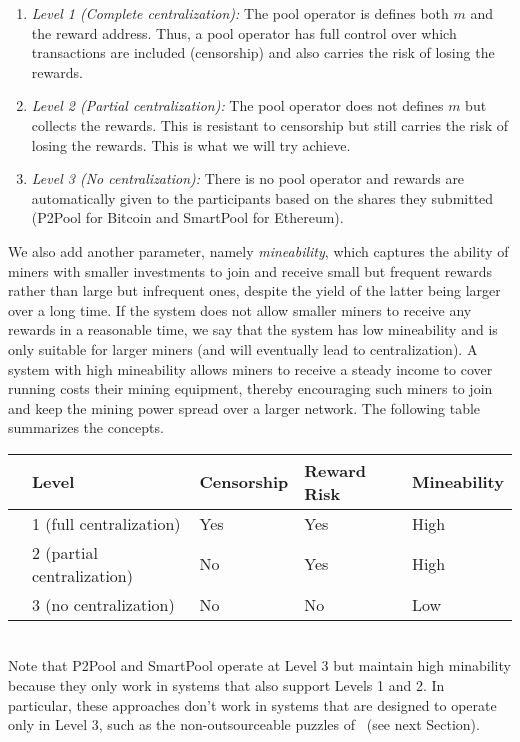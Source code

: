 \documentclass[11pt]{article}
\begin{document}
\begin{enumerate}
	\item {\em Level 1 (Complete centralization):} The pool operator is defines both $m$ and the reward address. Thus, a pool operator has full control over which transactions are included (censorship) and also carries the risk of losing the rewards.
	\item {\em Level 2 (Partial centralization):} The pool operator does not defines $m$ but collects the rewards. This is resistant to censorship but still carries the risk of losing the rewards. This is what we will try achieve. 
	\item {\em Level 3 (No centralization):} There is no pool operator and rewards are automatically given to the participants based on the shares they submitted (P2Pool for Bitcoin and SmartPool for Ethereum).
\end{enumerate}
We also add another parameter, namely {\em mineability}, which captures the ability of miners with smaller investments to join and receive small but frequent rewards rather than large but infrequent ones, despite the yield of the latter being larger over a long time. If the system does not allow smaller miners to receive any rewards in a reasonable time, we say that the system has low mineability and is only suitable for larger miners (and will eventually lead to centralization). A system with high mineability allows miners to receive a steady income to cover running costs their mining equipment, thereby encouraging such miners to join and keep the mining power spread over a larger network.
The following table summarizes the concepts.\\

	\begin{tabular}{lllll}
		& Level & Censorship & Reward Risk & Mineability \\\hline
		& 1 (full centralization)    & Yes & Yes & High \\
		& 2 (partial centralization)    & No & Yes & High \\
		& 3 (no centralization)    & No & No & Low
	\end{tabular}

~\\

Note that P2Pool and SmartPool operate at Level 3 but maintain high minability because they only work in systems that also support Levels  1 and 2. In particular, these approaches don't work in systems that are designed to operate only in Level 3, such as the non-outsourceable puzzles of~\cite{} (see next Section). 
\end{document}

